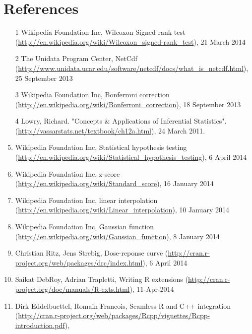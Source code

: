 \documentclass[12pt]{article}
\begin{document}
\section{References}
\begin{enumerate}
\item
[1] Wikipedia Foundation Inc, Wilcoxon Signed-rank test (\url{http://en.wikipedia.org/wiki/Wilcoxon_signed-rank_test}),  21 March 2014
\item
[2] The Unidata Program Center, NetCdf (\url{http://www.unidata.ucar.edu/software/netcdf/docs/what_is_netcdf.html}), 25 September 2013
\item
[3] Wikipedia Foundation Inc, Bonferroni correction (\url{http://en.wikipedia.org/wiki/Bonferroni_correction}), 18 September 2013
\item
[4]  Lowry, Richard. "Concepts \& Applications of Inferential Statistics". (\url{http://vassarstats.net/textbook/ch12a.html}), 24 March 2011.
\item Wikipedia Foundation Inc, Statistical hypothesis testing (\url{http://en.wikipedia.org/wiki/Statistical_hypothesis_testing}), 6 April 2014
\item Wikipedia Foundation Inc, z-score (\url{http://en.wikipedia.org/wiki/Standard_score}), 16 January 2014
\item Wikipedia Foundation Inc, linear interpolation (\url{http://en.wikipedia.org/wiki/Linear_interpolation}), 10 January 2014
\item Wikipedia Foundation Inc, Gaussian function (\url{http://en.wikipedia.org/wiki/Gaussian_function}), 8 January 2014
\item Christian Ritz, Jens Strebig, Dose-reponse curve (\url{http://cran.r-project.org/web/packages/drc/index.html}), 6 April 2014
\item Saikat DebRoy, Adrian Trapletti, Writing R extensions (\url{http://cran.r-project.org/doc/manuals/R-exts.html}), 11-Apr-2014
\item Dirk Eddelbuettel, Romain Francois, Seamless R and C++ integration (\url{http://cran.r-project.org/web/packages/Rcpp/vignettes/Rcpp-introduction.pdf}),
\end{enumerate}
\end{document}
